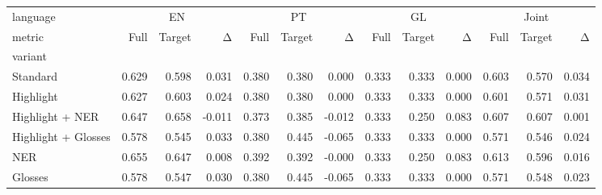 \begin{tabular}{lrrrrrrrrrrrr}
\toprule
language & \multicolumn{3}{c}{EN} & \multicolumn{3}{c}{PT} & \multicolumn{3}{c}{GL} & \multicolumn{3}{c}{Joint} \\
metric & Full & Target & Δ & Full & Target & Δ & Full & Target & Δ & Full & Target & Δ \\
variant &  &  &  &  &  &  &  &  &  &  &  &  \\
\midrule
Standard & 0.629 & 0.598 & 0.031 & 0.380 & 0.380 & 0.000 & 0.333 & 0.333 & 0.000 & 0.603 & 0.570 & 0.034 \\
Highlight & 0.627 & 0.603 & 0.024 & 0.380 & 0.380 & 0.000 & 0.333 & 0.333 & 0.000 & 0.601 & 0.571 & 0.031 \\
Highlight + NER & 0.647 & 0.658 & -0.011 & 0.373 & 0.385 & -0.012 & 0.333 & 0.250 & 0.083 & 0.607 & 0.607 & 0.001 \\
Highlight + Glosses & 0.578 & 0.545 & 0.033 & 0.380 & 0.445 & -0.065 & 0.333 & 0.333 & 0.000 & 0.571 & 0.546 & 0.024 \\
NER & 0.655 & 0.647 & 0.008 & 0.392 & 0.392 & -0.000 & 0.333 & 0.250 & 0.083 & 0.613 & 0.596 & 0.016 \\
Glosses & 0.578 & 0.547 & 0.030 & 0.380 & 0.445 & -0.065 & 0.333 & 0.333 & 0.000 & 0.571 & 0.548 & 0.023 \\
\bottomrule
\end{tabular}
